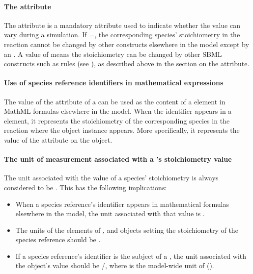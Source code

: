 \paragraph{The  attribute}

The \SpeciesReference attribute  is a
mandatory  attribute used to indicate whether the
 value can vary during a simulation.  If
=, the corresponding species'
stoichiometry in the reaction cannot be changed by other
constructs elsewhere in the model except by an \InitialAssignment.
A value of  means the stoichiometry can be changed by
other SBML constructs such as rules (see ),
as described above in the section on the 
attribute.


\paragraph{Use of species reference identifiers in mathematical expressions}
\label{sec:reaction:speciesReferences-in-mathematical-expressions}

The value of the  attribute of a \SpeciesReference can
be used as the content of a  element in MathML formulas
elsewhere in the model.  When the identifier appears in a 
element, it represents the stoichiometry of the corresponding
species in the reaction where the \SpeciesReference object
instance appears.  More specifically, it represents the value of
the  attribute on the \SpeciesReference
object.


\paragraph{The unit of measurement associated with a
  's stoichiometry value}
\label{sec:speciesreferences-units}

The unit associated with the value of a species' stoichiometry is
always considered to be .  This has the
following implications:
\begin{itemize}

\item When a species reference's identifier appears in
  mathematical formulas elsewhere in the model, the unit
  associated with that value is .

\item The units of the  elements of \AssignmentRule,
  \InitialAssignment and \EventAssignment objects setting the
  stoichiometry of the species reference should be
  .

\item If a species reference's identifier is the subject of a
  \RateRule, the unit associated with the \RateRule object's value
  should be /, where
   is the model-wide unit of 
  ().

\end{itemize}


